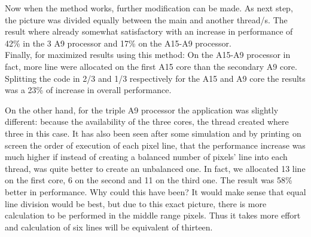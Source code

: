 \documentclass[journal]{IEEEtran}
\begin{document}
Now when the method works, further modification can be made. As next step, the picture was divided equally between the main and another thread/s. The result where already somewhat satisfactory with an increase in performance of 42\% in the 3 A9 processor and 17\% on the A15-A9 processor.\\

Finally, for maximized results using this method: On the A15-A9 processor in fact, more line were allocated on the first A15 core than the secondary A9 core. Splitting the code in 2/3 and 1/3 respectively for the A15 and A9 core the results was a 23\% of increase in overall performance.

On the other hand, for the triple A9 processor the application was slightly different: because the availability of the three cores, the thread created where three in this case. It has also been seen after some simulation and by printing on screen the order of execution of each pixel line, that the performance increase was much higher if instead of creating a balanced number of pixels’ line into each thread, was quite better to create an unbalanced one. In fact, we allocated 13 line on the first core, 6 on the second and 11 on the third one. The result was 58\% better in performance. Why could this have been? It would make sense that equal line division would be best, but due to this exact picture, there is more calculation to be performed in the middle range pixels. Thus it takes more effort and calculation of six lines will be equivalent of thirteen.
\end{document}
